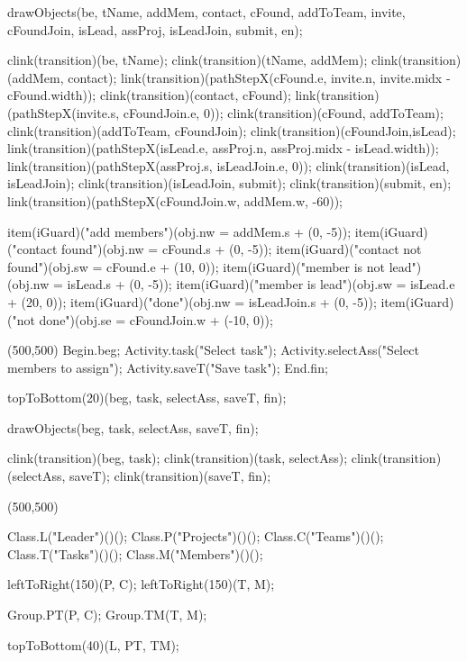 \begin{empfile}
\begin{empdef}[activityR2]
drawObjects(be, tName, addMem, contact, cFound, addToTeam, invite, cFoundJoin, isLead, assProj, isLeadJoin, submit, en);

clink(transition)(be, tName);
clink(transition)(tName, addMem);
clink(transition)(addMem, contact);
link(transition)(pathStepX(cFound.e, invite.n, invite.midx - cFound.width));
clink(transition)(contact, cFound);
link(transition)(pathStepX(invite.s, cFoundJoin.e, 0));
clink(transition)(cFound, addToTeam);
clink(transition)(addToTeam, cFoundJoin);
clink(transition)(cFoundJoin,isLead);
link(transition)(pathStepX(isLead.e, assProj.n, assProj.midx - isLead.width));
link(transition)(pathStepX(assProj.s, isLeadJoin.e, 0));
clink(transition)(isLead, isLeadJoin);
clink(transition)(isLeadJoin, submit); 
clink(transition)(submit, en);
link(transition)(pathStepX(cFoundJoin.w, addMem.w, -60));

item(iGuard)("add members")(obj.nw = addMem.s + (0, -5));
item(iGuard)("contact found")(obj.nw = cFound.s + (0, -5));
item(iGuard)("contact not found")(obj.sw = cFound.e + (10, 0));
item(iGuard)("member is not lead")(obj.nw = isLead.s + (0, -5));
item(iGuard)("member is lead")(obj.sw = isLead.e + (20, 0));
item(iGuard)("done")(obj.nw = isLeadJoin.s + (0, -5));
item(iGuard)("not done")(obj.se = cFoundJoin.w + (-10, 0));
\end{empdef}

\begin{empdef}[activityR4](500,500)
Begin.beg;
Activity.task("Select task");
Activity.selectAss("Select members to assign");
Activity.saveT("Save task");
End.fin;

topToBottom(20)(beg, task, selectAss, saveT, fin);

drawObjects(beg, task, selectAss, saveT, fin);

clink(transition)(beg, task);
clink(transition)(task, selectAss);
clink(transition)(selectAss, saveT);
clink(transition)(saveT, fin);
\end{empdef}

\begin{empdef}[erdiag](500,500)

Class.L("Leader")()();
Class.P("Projects")()();
Class.C("Teams")()();
Class.T("Tasks")()();
Class.M("Members")()();

leftToRight(150)(P, C);
leftToRight(150)(T, M);

Group.PT(P, C);
Group.TM(T, M);

topToBottom(40)(L, PT, TM);




\end{empdef}
\end{empfile}
